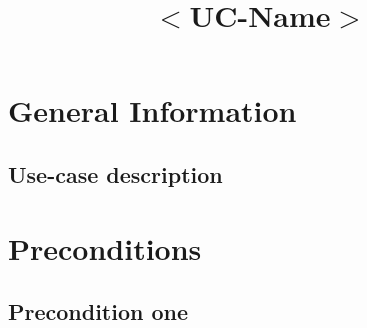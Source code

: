 \documentclass[notitlepage,fullpage]{article}
\date{}
\title{#1}
\newcommand{\name}[1]{%
   \title{#1}
   \maketitle
}
\begin{document}
   \name{$<$UC-Name$>$}

\vspace{-2cm}%
\begin{comment}
	\begin{color}{blue}
  		\noindent\textbf{Note}: this template is provided to help on writing a use case specification. The text in blue is included to guide the authors.]
  \end{color}
\end{comment}

\section{General Information}
\subsection{Use-case description}

\begin{comment}
	\textcolor{blue}{\noindent The description communicates the reason(s) of the use case. In general, a well-written description comprises: (a)  the problem which the use case solves; (b) the importance that the use case has in the whole system; and (c) what is achieved by executing the use case. A single or two paragraphs will suffice for this description.}
\end{comment}


\section{Preconditions}

\begin{comment}
	\textcolor{blue}{A precondition of a use case represents the state of the system that must be present (i.e., must be true) prior to a use case being performed. A well-defined precondition can be easily checked. For example, instead of saying that a system B must available, it should tell the system's name, accessing address, among others.}%
\end{comment}

\subsection{Precondition one}
\begin{comment}
   \textcolor{blue}{A first precondition.}
\end{comment}
\end{document}
